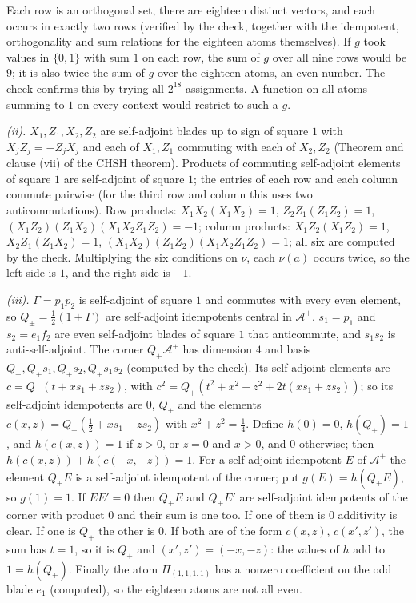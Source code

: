 Each row is an orthogonal set, there are eighteen distinct vectors, and each occurs in exactly two rows (verified by the check, together with the idempotent, orthogonality and sum relations for the eighteen atoms themselves). If $g$ took values in $\{0, 1\}$ with sum $1$ on each row, the sum of $g$ over all nine rows would be $9$; it is also twice the sum of $g$ over the eighteen atoms, an even number. The check confirms this by trying all $2^{18}$ assignments. A function on all atoms summing to $1$ on every context would restrict to such a $g$.

\emph{(ii).} $X_{1}, Z_{1}, X_{2}, Z_{2}$ are self-adjoint blades up to sign of square $1$ with $X_{j}Z_{j} = -Z_{j}X_{j}$ and each of $X_{1}, Z_{1}$ commuting with each of $X_{2}, Z_{2}$ (Theorem  and clause (vii) of the CHSH theorem). Products of commuting self-adjoint elements of square $1$ are self-adjoint of square $1$; the entries of each row and each column commute pairwise (for the third row and column this uses two anticommutations). Row products: $X_{1}X_{2}(X_{1}X_{2}) = 1$, $Z_{2}Z_{1}(Z_{1}Z_{2}) = 1$, $(X_{1}Z_{2})(Z_{1}X_{2})(X_{1}X_{2}Z_{1}Z_{2}) = -1$; column products: $X_{1}Z_{2}(X_{1}Z_{2}) = 1$, $X_{2}Z_{1}(Z_{1}X_{2}) = 1$, $(X_{1}X_{2})(Z_{1}Z_{2})(X_{1}X_{2}Z_{1}Z_{2}) = 1$; all six are computed by the check. Multiplying the six conditions on $\nu$, each $\nu(a)$ occurs twice, so the left side is $1$, and the right side is $-1$.

\emph{(iii).} $\Gamma = p_{1}p_{2}$ is self-adjoint of square $1$ and commutes with every even element, so $Q_{\pm} = \tfrac12(1 \pm \Gamma)$ are self-adjoint idempotents central in $\mathcal{A}^{+}$. $s_{1} = p_{1}$ and $s_{2} = e_{1}f_{2}$ are even self-adjoint blades of square $1$ that anticommute, and $s_{1}s_{2}$ is anti-self-adjoint. The corner $Q_{+}\mathcal{A}^{+}$ has dimension $4$ and basis $Q_{+}, Q_{+}s_{1}, Q_{+}s_{2}, Q_{+}s_{1}s_{2}$ (computed by the check). Its self-adjoint elements are $c = Q_{+}(t + xs_{1} + zs_{2})$, with $c^{2} = Q_{+}(t^{2} + x^{2} + z^{2} + 2t(xs_{1} + zs_{2}))$; so its self-adjoint idempotents are $0$, $Q_{+}$ and the elements $c(x, z) = Q_{+}(\tfrac12 + xs_{1} + zs_{2})$ with $x^{2} + z^{2} = \tfrac14$. Define $h(0) = 0$, $h(Q_{+}) = 1$, and $h(c(x, z)) = 1$ if $z > 0$, or $z = 0$ and $x > 0$, and $0$ otherwise; then $h(c(x, z)) + h(c(-x, -z)) = 1$. For a self-adjoint idempotent $E$ of $\mathcal{A}^{+}$ the element $Q_{+}E$ is a self-adjoint idempotent of the corner; put $g(E) = h(Q_{+}E)$, so $g(1) = 1$. If $EE' = 0$ then $Q_{+}E$ and $Q_{+}E'$ are self-adjoint idempotents of the corner with product $0$ and their sum is one too. If one of them is $0$ additivity is clear. If one is $Q_{+}$ the other is $0$. If both are of the form $c(x, z)$, $c(x', z')$, the sum has $t = 1$, so it is $Q_{+}$ and $(x', z') = (-x, -z)$: the values of $h$ add to $1 = h(Q_{+})$. Finally the atom $\Pi_{(1,1,1,1)}$ has a nonzero coefficient on the odd blade $e_{1}$ (computed), so the eighteen atoms are not all even.

